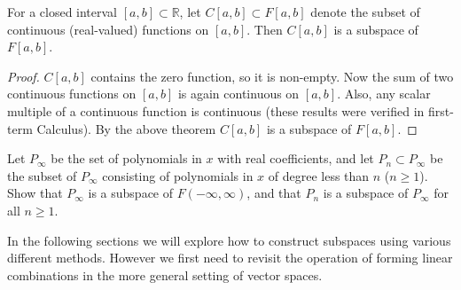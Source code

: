 \documentclass{ximera}
\begin{document}
\begin{proposition} For a closed interval $[a,b]\subset\mathbb R$, let $C[a,b]\subset F[a,b]$ denote the subset of continuous (real-valued) functions on $[a,b]$. Then $C[a,b]$ is a subspace of $F[a,b]$.
\end{proposition}

\begin{proof} $C[a,b]$ contains the zero function, so it is non-empty. Now the sum of two continuous functions on $[a,b]$ is again continuous on $[a,b]$. Also, any scalar multiple of a continuous function is continuous (these results were verified in first-term Calculus). By the above theorem $C[a,b]$ is a subspace of $F[a,b]$.
\end{proof}

\begin{exercise} Let $P_\infty$ be the set of polynomials in $x$ with real coefficients, and let $P_n\subset P_\infty$ be the subset of $P_\infty$ consisting of polynomials in $x$ of degree less than $n$ ($n\ge 1$). Show that $P_\infty$ is a subspace of $F(-\infty,\infty)$, and that $P_n$ is a subspace of $P_\infty$ for all $n\ge 1$.
\end{exercise}

In the following sections we will explore how to construct subspaces using various different methods. However we first need to revisit the operation of forming linear combinations in the more general setting of vector spaces. 
\end{document}
